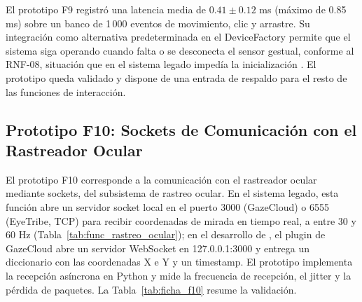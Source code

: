 El prototipo F9 registró una latencia media de $0.41 \pm 0.12$ ms (máximo de 0.85 ms) sobre un banco de 1\,000 eventos de movimiento, clic y arrastre. Su integración como alternativa predeterminada en el DeviceFactory permite que el sistema siga operando cuando falta o se desconecta el sensor gestual, conforme al RNF-08, situación que en el sistema legado impedía la inicialización \citep{ibaceta2023evaluacion}. El prototipo queda validado y dispone de una entrada de respaldo para el resto de las funciones de interacción.
 
\subsection{Prototipo F10: Sockets de Comunicación con el Rastreador Ocular}
 
El prototipo F10 corresponde a la comunicación con el rastreador ocular mediante sockets, del subsistema de rastreo ocular. En el sistema legado, esta función abre un servidor socket local en el puerto 3000 (GazeCloud) o 6555 (EyeTribe, TCP) para recibir coordenadas de mirada en tiempo real, a entre 30 y 60 Hz (Tabla~\ref{tab:func_rastreo_ocular}); en el desarrollo de \cite{estay2020modulo}, el plugin de GazeCloud abre un servidor WebSocket en 127.0.0.1:3000 y entrega un diccionario con las coordenadas X e Y y un timestamp. El prototipo implementa la recepción asíncrona en Python y mide la frecuencia de recepción, el jitter y la pérdida de paquetes. La Tabla~\ref{tab:ficha_f10} resume la validación.
 
